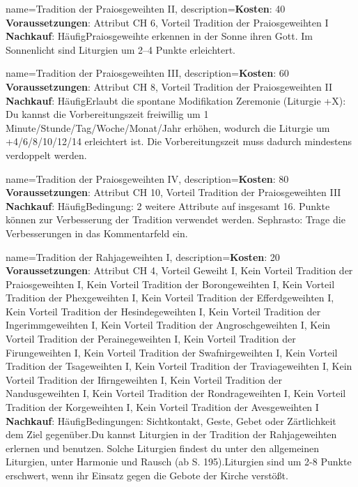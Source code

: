 {
    name={Tradition der Praiosgeweihten II},
    description={\textbf{Kosten}: 40 \textbf{Voraussetzungen}: Attribut CH 6, Vorteil Tradition der Praiosgeweihten I \textbf{Nachkauf}: Häufig\newline Praiosgeweihte erkennen in der Sonne ihren Gott. Im Sonnenlicht sind Liturgien um 2–4 Punkte erleichtert.}
}


{
    name={Tradition der Praiosgeweihten III},
    description={\textbf{Kosten}: 60 \textbf{Voraussetzungen}: Attribut CH 8, Vorteil Tradition der Praiosgeweihten II \textbf{Nachkauf}: Häufig\newline Erlaubt die spontane Modifikation Zeremonie (Liturgie +X): Du kannst die Vorbereitungszeit freiwillig um 1 Minute/Stunde/Tag/Woche/Monat/Jahr erhöhen, wodurch die Liturgie um +4/6/8/10/12/14 erleichtert ist. Die Vorbereitungszeit muss dadurch mindestens verdoppelt werden.}
}


{
    name={Tradition der Praiosgeweihten IV},
    description={\textbf{Kosten}: 80 \textbf{Voraussetzungen}: Attribut CH 10, Vorteil Tradition der Praiosgeweihten III \textbf{Nachkauf}: Häufig\newline Bedingung: 2 weitere Attribute auf insgesamt 16. Punkte können zur Verbesserung der Tradition verwendet werden. Sephrasto: Trage die Verbesserungen in das Kommentarfeld ein.}
}


{
    name={Tradition der Rahjageweihten I},
    description={\textbf{Kosten}: 20 \textbf{Voraussetzungen}: Attribut CH 4, Vorteil Geweiht I, Kein Vorteil Tradition der Praiosgeweihten I, Kein Vorteil Tradition der Borongeweihten I, Kein Vorteil Tradition der Phexgeweihten I, Kein Vorteil Tradition der Efferdgeweihten I, Kein Vorteil Tradition der Hesindegeweihten I, Kein Vorteil Tradition der Ingerimmgeweihten I, Kein Vorteil Tradition der Angroschgeweihten I, Kein Vorteil Tradition der Perainegeweihten I, Kein Vorteil Tradition der Firungeweihten I, Kein Vorteil Tradition der Swafnirgeweihten I, Kein Vorteil Tradition der Tsageweihten I, Kein Vorteil Tradition der Traviageweihten I, Kein Vorteil Tradition der Ifirngeweihten I, Kein Vorteil Tradition der Nandusgeweihten I, Kein Vorteil Tradition der Rondrageweihten I, Kein Vorteil Tradition der Korgeweihten I, Kein Vorteil Tradition der Avesgeweihten I \textbf{Nachkauf}: Häufig\newline Bedingungen: Sichtkontakt, Geste, Gebet oder Zärtlichkeit dem Ziel gegenüber.\newline Du kannst Liturgien in der Tradition der Rahjageweihten erlernen und benutzen. Solche Liturgien findest du unter den allgemeinen Liturgien, unter Harmonie und Rausch (ab S. 195).\newline Liturgien sind um 2-8 Punkte erschwert, wenn ihr Einsatz gegen die Gebote der Kirche verstößt.}
}


